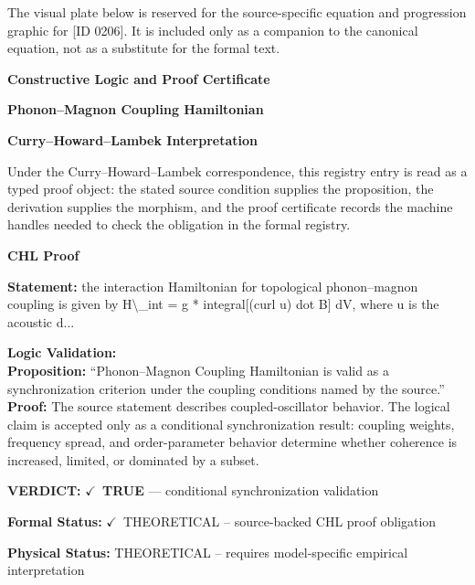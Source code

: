 \begingroup\footnotesize\sloppy
The visual plate below is reserved for the source-specific equation and progression graphic for [ID 0206]. It is included only as a companion to the canonical equation, not as a substitute for the formal text.
\par\endgroup
\ifTZPDarkEdition
{}
\fi

\clearpage
\begingroup\tzpsupportsetup
\noindent\textbf{\fontsize{10.8pt}{12.8pt}\selectfont [ID 0206] Constructive Logic and Proof Certificate}\par
\noindent\textbf{\fontsize{10pt}{12pt}\selectfont Phonon--Magnon Coupling Hamiltonian}\par
\vspace{0.45em}
\begingroup
\footnotesize
\setlength{\parskip}{0.22em}
\setlength{\parindent}{0pt}
\noindent\textbf{Curry--Howard--Lambek Interpretation}\par
Under the Curry--Howard--Lambek correspondence, this registry entry is read as a typed proof
object: the stated source condition supplies the proposition, the derivation supplies the
morphism, and the proof certificate records the machine handles needed to check the obligation
in the formal registry.

\vspace{0.45em}
\noindent\textbf{CHL Proof}\par
\textbf{Statement:} the interaction Hamiltonian for topological phonon--magnon coupling is given by H\textbackslash{}\_int =
g * integral[(curl u) dot B] dV, where u is the acoustic d...

\textbf{Logic Validation:}\\
\textbf{Proposition:} ``Phonon--Magnon Coupling Hamiltonian is valid as a synchronization criterion under the
coupling conditions named by the source.''\\
\textbf{Proof:} The source statement describes coupled-oscillator behavior. The logical claim is
accepted only as a conditional synchronization result: coupling weights, frequency
spread, and order-parameter behavior determine whether coherence is increased, limited,
or dominated by a subset.

\textbf{VERDICT:} \ensuremath{\checkmark}\ \textbf{TRUE} --- conditional synchronization validation

\textbf{Formal Status:} \ensuremath{\checkmark}\ THEORETICAL -- source-backed CHL proof obligation

\textbf{Physical Status:} THEORETICAL -- requires model-specific empirical interpretation
\par\vspace{0.45em}
\par
\ifTZPDarkEdition
{}
\fi
\endgroup
\endgroup

